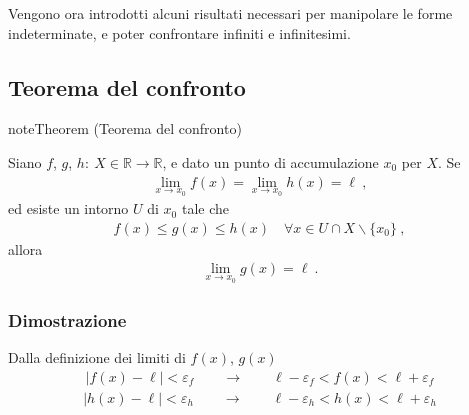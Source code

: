 \documentclass[letterpaper,10pt,italian]{jupyterBook}
\begin{document}
\sphinxAtStartPar
Vengono ora introdotti alcuni risultati necessari per manipolare le forme indeterminate, e poter confrontare infiniti e infinitesimi.


\subsection{Teorema del confronto}
\label{\detokenize{ch/infinitesimal_calculus/analysis:teorema-del-confronto}}\label{\detokenize{ch/infinitesimal_calculus/analysis:infinitesimal-calculus-limits-thms-comparison}}\label{None:thm:infinitesimal-calculus:continuous-fun:thms:comparison}
\begin{sphinxadmonition}{note}{Theorem  (Teorema del confronto)}



\sphinxAtStartPar
Siano \(f\), \(g\), \(h: \ X \in \mathbb{R} \rightarrow \mathbb{R}\), e dato un punto di accumulazione \(x_0\) per \(X\). Se
\begin{equation*}
\begin{split}\lim_{x \rightarrow x_0} f(x) = \lim_{x \rightarrow x_0} h(x) = \ell \ ,\end{split}
\end{equation*}
\sphinxAtStartPar
ed esiste un intorno \(U\) di \(x_0\) tale che
\begin{equation*}
\begin{split}f(x) \le g(x) \le h(x) \quad \forall x \in U \cap X \backslash \{ x_0 \} \ ,\end{split}
\end{equation*}
\sphinxAtStartPar
allora
\begin{equation*}
\begin{split}\lim_{x \rightarrow x_0} g(x) = \ell \ .\end{split}
\end{equation*}\end{sphinxadmonition}
\subsubsection*{Dimostrazione}

\sphinxAtStartPar
Dalla definizione dei limiti di \(f(x)\), \(g(x)\)
\begin{equation*}
\begin{split}|f(x) - \ell| < \varepsilon_f \qquad \rightarrow \qquad \ell - \varepsilon_f < f(x) < \ell + \varepsilon_f\end{split}
\end{equation*}\begin{equation*}
\begin{split}|h(x) - \ell| < \varepsilon_h \qquad \rightarrow \qquad \ell - \varepsilon_h < h(x) < \ell + \varepsilon_h\end{split}
\end{equation*}
\sphinxAtStartPar
{} 
\end{document}
